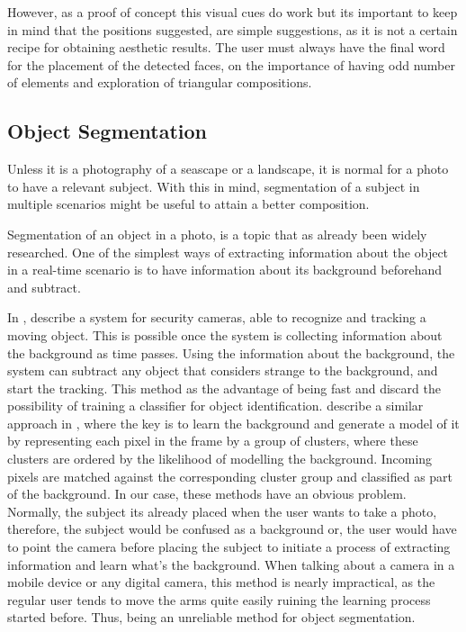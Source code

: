 However, as a proof of concept this visual cues do work but its important to keep in mind that the positions suggested, are simple suggestions, as it is not a certain recipe for obtaining aesthetic results. The user must always have the final word for the placement of the detected faces, on the importance of having odd number of elements and exploration of triangular compositions.

\subsection{Object Segmentation}
\label{sub:segmentation}

Unless it is a photography of a seascape or a landscape, it is normal for a photo to have a relevant subject. With this in mind, segmentation of a subject in multiple scenarios might be useful to attain a better composition.

Segmentation of an object in a photo, is a topic that as already been widely researched. One of the simplest ways of extracting information about the object in a real-time scenario is to have information about its background beforehand and subtract. 

In \cite{yang2004real}, \citeauthor{yang2004real} describe a system for security cameras, able to recognize and tracking a moving object. This is possible once the system is collecting information about the background as time passes. Using the information about the background, the system can subtract any object that considers strange to the background, and start the tracking. This method as the advantage of being fast and discard the possibility of training a classifier for object identification. 
\citeauthor{butler2003real} describe a similar approach in \cite{butler2003real}, where the key is to learn the background and generate a model of it by representing each pixel in the frame by a group of clusters, where these clusters are ordered by the likelihood of modelling the background. Incoming pixels are matched against the corresponding cluster group and classified as part of the background.
In our case, these methods have an obvious problem. Normally, the subject its already placed when the user wants to take a photo, therefore, the subject would be confused as a background or, the user would have to point the camera before placing the subject to initiate a process of extracting information and learn what's the background. When talking about a  camera in a mobile device or any digital camera, this method is nearly impractical, as the regular user tends to move the arms quite easily ruining the learning process started before. Thus, being an unreliable method for object segmentation.

